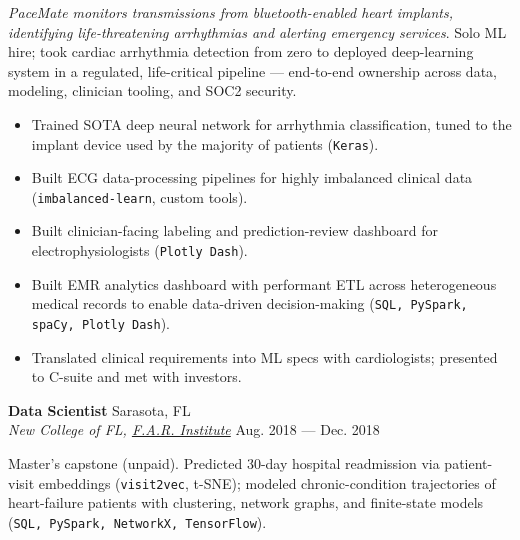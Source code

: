 \documentclass[a4paper,12pt]{article}
\newcommand{\ressubheading}[4]{{\begin{minipage}{\textwidth}
                                    \textbf{#1} \hfill #2 \\
                                    \textit{#3} \hfill #4 \\
\end{minipage}}}
\begin{document}
    \vspace{-6pt} \textit{PaceMate monitors transmissions from bluetooth-enabled heart implants, identifying life-threatening arrhythmias and alerting emergency services}. Solo ML hire; took cardiac arrhythmia detection from zero to deployed deep-learning system in a regulated, life-critical pipeline --- end-to-end ownership across data, modeling, clinician tooling, and SOC2 security.
    \begin{itemize}
        \item Trained SOTA deep neural network for arrhythmia classification, tuned to the implant device used by the majority of patients (\texttt{Keras}).
        \item Built ECG data-processing pipelines for highly imbalanced clinical data (\texttt{imbalanced-learn}, custom tools).
        \item Built clinician-facing labeling and prediction-review dashboard for electrophysiologists (\texttt{Plotly Dash}).
        \item Built EMR analytics dashboard with performant ETL across heterogeneous medical records to enable data-driven decision-making (\texttt{SQL, PySpark, spaCy, Plotly Dash}).
        \item Translated clinical requirements into ML specs with cardiologists; presented to C-suite and met with investors.
    \end{itemize}


    \ressubheading{Data Scientist}{Sarasota, FL}{New College of FL, \href{farinstitute.org}{F.A.R. Institute}}{Aug. 2018 --- Dec. 2018}

    \vspace{-6pt} Master's capstone (unpaid). Predicted 30-day hospital readmission via patient-visit embeddings (\texttt{visit2vec}, t-SNE); modeled chronic-condition trajectories of heart-failure patients with clustering, network graphs, and finite-state models (\texttt{SQL, PySpark, NetworkX, TensorFlow}).\\
\end{document}

